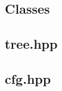 \documentclass[9pt]{extarticle}
\begin{document}
	\begin{multicols*}{3}
		\setlength{\parskip}{0.0in}
		\tableofcontents
		\setlength{\parskip}{0.1in}
		\section{Classes}
		\subsection{tree.hpp}
		
		\subsection{cfg.hpp}
		
    \end{multicols*}
\end{document}
